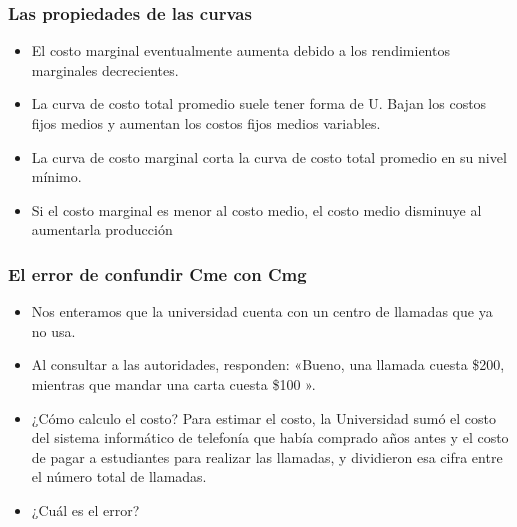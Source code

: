 \documentclass{beamer}
\begin{document}
\begin{frame}
\frametitle{Las propiedades de las curvas}
\begin{itemize}
    \item El costo marginal eventualmente aumenta debido a los rendimientos marginales decrecientes.
    \item La curva de costo total promedio suele tener forma de U. Bajan los costos fijos medios y aumentan los costos fijos medios variables.
    \item La curva de costo marginal corta la curva de costo total promedio en su nivel mínimo.
    \item Si el costo marginal es menor al costo medio, el costo medio disminuye al aumentarla producción
\end{itemize}
\end{frame}

\begin{frame}
\frametitle{El error de confundir Cme con Cmg}
\begin{itemize}
    \item Nos enteramos que la universidad cuenta con un centro de llamadas que ya no usa.
    \item Al consultar a las autoridades, responden: «Bueno, una llamada cuesta \$200, mientras que mandar una carta cuesta \$100 ». 
    \item ¿Cómo calculo el costo? Para estimar el costo, la Universidad sumó el costo del sistema informático de telefonía que había comprado años antes y el costo de pagar a estudiantes para realizar las llamadas, y dividieron esa cifra entre el número total de llamadas.
    \item ¿Cuál es el error?
\end{itemize}
\end{frame}


\end{document}
